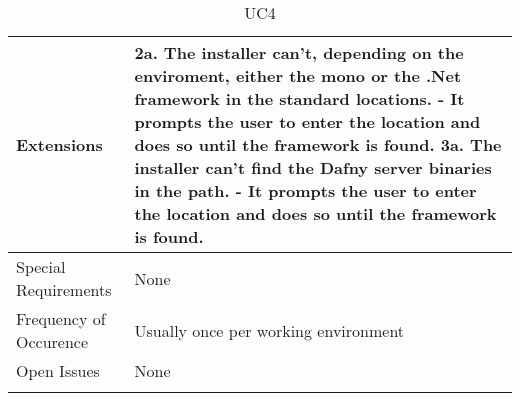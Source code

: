\begin{longtable}{l | p{} }
	Extensions & 
	2a. The installer can't, depending on the enviroment, either the mono or the .Net framework in the standard locations. \newline 
	- It prompts the user to enter the location and does so until the framework is found. \newline
	3a. The installer can't find the Dafny server binaries in the path. \newline
	- It prompts the user to enter the location and does so until the framework is found.\\ \hline
	Special Requirements & None\\ \hline
	Frequency of Occurence & Usually once per working environment\\ \hline
	Open Issues & None \\ \hline
	\caption{UC4}
\end{longtable}

